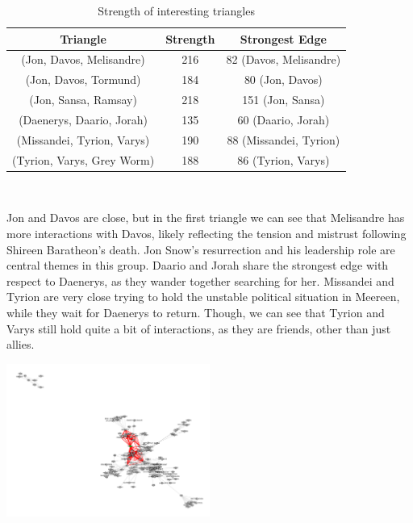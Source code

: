\documentclass[10pt,twocolumn,letterpaper]{article}
\begin{document}
\begin{table}[h!]
    \centering
    \small
    \begin{tabular}{c|c|c}
        Triangle & Strength & Strongest Edge  \\
        \hline
        (Jon, Davos, Melisandre) & 216 & 82 (Davos, Melisandre) \\
        (Jon, Davos, Tormund) & 184 & 80 (Jon, Davos) \\
        (Jon, Sansa, Ramsay) & 218 & 151 (Jon, Sansa) \\
        (Daenerys, Daario, Jorah) & 135 & 60 (Daario, Jorah) \\
        (Missandei, Tyrion, Varys) & 190 & 88 (Missandei, Tyrion) \\
        (Tyrion, Varys, Grey Worm) & 188 & 86 (Tyrion, Varys) \\
        \hline 
    \end{tabular} \\
    \vspace{0.2cm}
    \caption{Strength of interesting triangles}
    \label{tab:my_label}
\end{table}

Jon and Davos are close, but in the first triangle we can see that Melisandre has more interactions with Davos, likely reflecting the tension and mistrust following Shireen Baratheon’s death. Jon Snow’s resurrection and his leadership role are central themes in this group.
Daario and Jorah share the strongest edge with respect to Daenerys, as they wander together searching for her.
Missandei and Tyrion are very close trying to hold the unstable political situation in Meereen, while they wait for Daenerys to return. Though, we can see that Tyrion and Varys still hold quite a bit of interactions, as they are friends, other than just allies.

\begin{center}
    \includegraphics[width=0.5\textwidth]{img/s6/tyrion_triangles.jpg}
\end{center}
\end{document}
